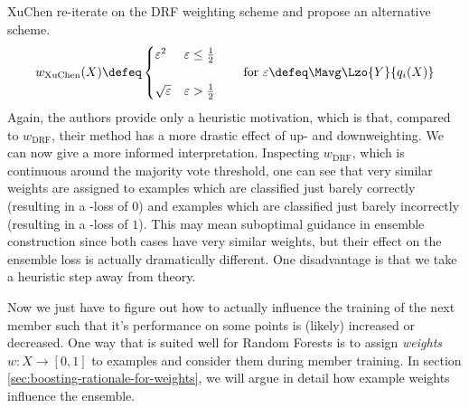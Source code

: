\documentclass[../main.tex]{subfiles}
\begin{document}
XuChen re-iterate on the DRF weighting scheme and propose an alternative scheme.
$$
w_{\text{XuChen}}(X) \defeq \begin{cases}
\varepsilon^2 & \varepsilon \leq \frac{1}{2} \\ \\
\sqrt{\varepsilon} & \varepsilon > \frac{1}{2}
\end{cases}
\hspace{2em} \text{for~}  \varepsilon \defeq \Mavg \Lzo{Y}{q_i(X)}
$$
Again, the authors provide only a heuristic motivation, which is that, compared to $w_{\text{DRF}}$, their method has a more drastic effect of up- and downweighting. We can now give a more informed interpretation. Inspecting $w_{\text{DRF}}$, which is continuous around the majority vote threshold, one can see that very similar weights are assigned to examples which are classified just barely correctly (resulting in a \zeroone-loss of $0$) and examples which are classified just barely incorrectly (resulting in a \zeroone-loss of $1$). This may mean suboptimal guidance in ensemble construction since both cases have very similar weights, but their effect on the ensemble loss is actually dramatically different. One disadvantage is that we take a heuristic step away from theory. %




Now we just have to figure out
how to actually influence the training of the next member such that it's performance on some points is (likely) increased or decreased. One way that is suited well for Random Forests
is to assign \textit{weights} $w: X \to [0,1]$ to examples and consider them during member training. 
In section \ref{sec:boosting-rationale-for-weights}, we will argue in detail how example weights influence the ensemble. %
\end{document}
